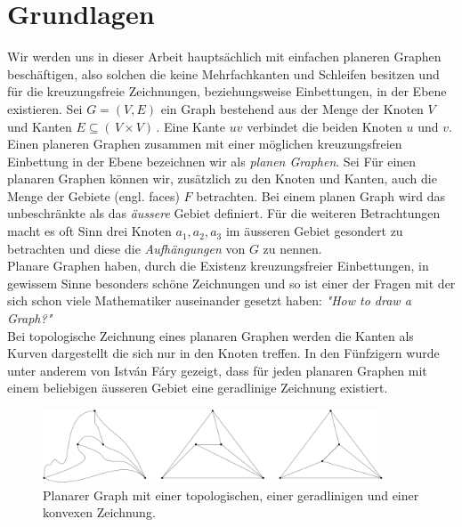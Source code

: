 \chapter{Grundlagen}\label{intro}

Wir werden uns in dieser Arbeit hauptsächlich mit einfachen planeren Graphen beschäftigen, also solchen die keine Mehrfachkanten und Schleifen besitzen und für die kreuzungsfreie Zeichnungen, beziehungsweise Einbettungen, in der Ebene existieren. Sei $G = (V,E)$ ein Graph bestehend aus der Menge der Knoten $V$ und Kanten $E \subseteq ( \,V \times V ) \,$. Eine Kante $uv$ verbindet die beiden Knoten $u$ und $v$. Einen planeren Graphen zusammen mit einer möglichen kreuzungsfreien Einbettung in der Ebene bezeichnen wir als \textit{planen Graphen}. Sei Für einen planaren Graphen können wir, zusätzlich zu den Knoten und Kanten, auch die Menge der Gebiete (engl. faces) $F$ betrachten. Bei einem planen Graph wird das unbeschränkte als das \textit{äussere} Gebiet definiert. Für die weiteren Betrachtungen macht es oft Sinn drei Knoten $a_1,a_2,a_3$ im äusseren Gebiet gesondert zu betrachten und diese die \textit{Aufhängungen} von $G$ zu nennen.\\

Planare Graphen haben, durch die Existenz kreuzungsfreier Einbettungen, in gewissem Sinne besonders schöne Zeichnungen und so ist einer der Fragen mit der sich schon viele Mathematiker auseinander gesetzt haben: \textit{"How to draw a Graph?"}\cite{tutte63}\\

Bei topologische Zeichnung eines planaren Graphen werden die Kanten als Kurven dargestellt die sich nur in den Knoten treffen. In den Fünfzigern wurde unter anderem von István Fáry gezeigt, dass für jeden planaren Graphen mit einem beliebigen äusseren Gebiet eine geradlinige Zeichnung existiert. \cite{fary48}

\begin{figure}
	\centering
  \includegraphics[width=0.9\textwidth]{topo_straight_convex.png}
	\caption{Planarer Graph mit einer topologischen, einer geradlinigen und einer konvexen Zeichnung.}
	\label{cut_figure}
\end{figure}

